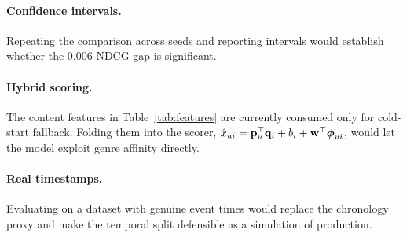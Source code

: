 \paragraph{Confidence intervals.} Repeating the comparison across seeds and
reporting intervals would establish whether the $0.006$ NDCG gap is
significant.

\paragraph{Hybrid scoring.} The content features in
Table~\ref{tab:features} are currently consumed only for cold-start fallback.
Folding them into the scorer, $\hat{x}_{ui} = \mathbf{p}_u^{\top}\mathbf{q}_i + b_i +
\mathbf{w}^{\top}\boldsymbol{\phi}_{ui}$, would let the model exploit genre
affinity directly.

\paragraph{Real timestamps.} Evaluating on a dataset with genuine event times
would replace the chronology proxy and make the temporal split defensible as
a simulation of production.
